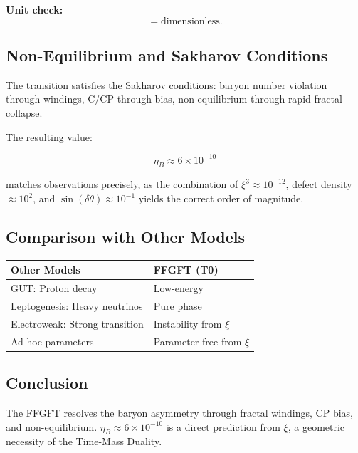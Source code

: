 	\textbf{Unit check:}
	\begin{equation}
		[\delta \theta_{\text{CP}}] = \text{dimensionless}.
	\end{equation}
	
	\subsection*{Non-Equilibrium and Sakharov Conditions}
	
	The transition satisfies the Sakharov conditions: baryon number violation through windings, C/CP through bias, non-equilibrium through rapid fractal collapse.
	
	The resulting value:
	
	\begin{equation}
		\eta_B \approx 6 \times 10^{-10}
	\end{equation}
	
	matches observations precisely, as the combination of \(\xi^3 \approx 10^{-12}\), defect density \(\approx 10^{2}\), and \(\sin(\delta \theta) \approx 10^{-1}\) yields the correct order of magnitude.
	
	\subsection*{Comparison with Other Models}
	
	\begin{center}
		\begin{tabular}{p{}p{}}
			\textbf{Other Models} & \textbf{FFGFT (T0)} \\
			\hline
			GUT: Proton decay & Low-energy \\
			Leptogenesis: Heavy neutrinos & Pure phase \\
			Electroweak: Strong transition & Instability from \(\xi\) \\
			Ad-hoc parameters & Parameter-free from \(\xi\) \\
		\end{tabular}
	\end{center}
	
	\subsection*{Conclusion}
	
	The FFGFT resolves the baryon asymmetry through fractal windings, CP bias, and non-equilibrium. \(\eta_B \approx 6 \times 10^{-10}\) is a direct prediction from \(\xi\), a geometric necessity of the Time-Mass Duality.



